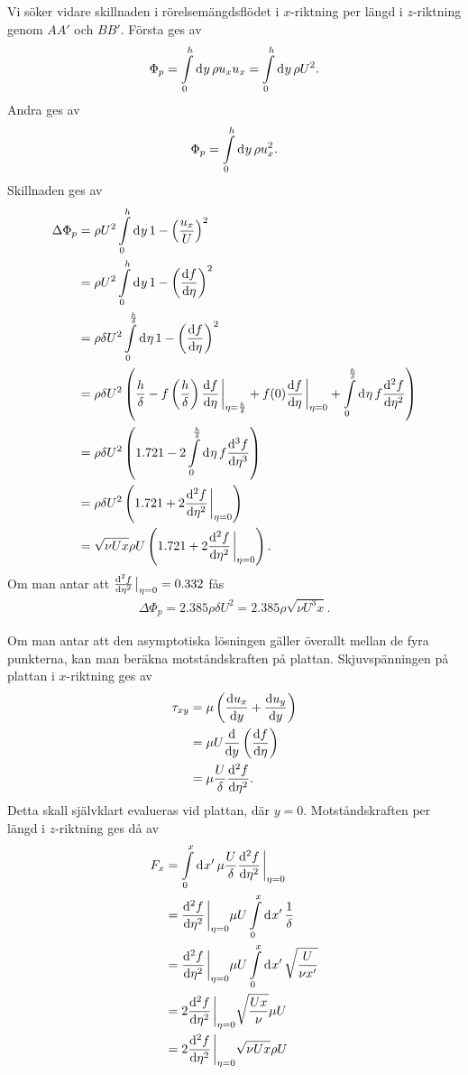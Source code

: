 Vi söker vidare skillnaden i rörelsemängdsflödet i $x$-riktning per längd i $z$-riktning genom $AA'$ och $BB'$. Första ges av
\begin{align*}
	\Phi_{p} = \int\limits_{0}^{h}\dd[]{y}\rho u_{x}u_{x} = \int\limits_{0}^{h}\dd[]{y}\rho U^{2}.
\end{align*}
Andra ges av
\begin{align*}
	\Phi_{p} = \int\limits_{0}^{h}\dd[]{y}\rho u_{x}^{2}.
\end{align*}
Skillnaden ges av
\begin{align*}
	\Delta\Phi_{p} &= \rho U^{2}\integ{0}{h}{y}{1 - \left(\frac{u_{x}}{U}\right)^{2}} \\
	               &= \rho U^{2}\integ{0}{h}{y}{1 - \left(\dv{f}{\eta}\right)^{2}} \\
	               &= \rho\delta U^{2}\integ{0}{\frac{h}{\delta}}{\eta}{1 - \left(\dv{f}{\eta}\right)^{2}} \\
	               &= \rho\delta U^{2}\left(\frac{h}{\delta} - f\left(\frac{h}{\delta}\right)\dv{f}{\eta}\eval_{\eta = \frac{h}{\delta}} + f(0)\dv{f}{\eta}\eval_{\eta = 0} +  \integ{0}{\frac{h}{\delta}}{\eta}{f\dv[2]{f}{\eta}}\right) \\
	               &= \rho\delta U^{2}\left(1.721 - 2\integ{0}{\frac{h}{\delta}}{\eta}{f\dv[3]{f}{\eta}}\right) \\
	               &= \rho\delta U^{2}\left(1.721 + 2\dv[2]{f}{\eta}\eval_{\eta = 0}\right) \\
	               &= \sqrt{\nu Ux}\rho U\left(1.721 + 2\dv[2]{f}{\eta}\eval_{\eta = 0}\right).
\end{align*}
Om man antar att $\dv[2]{f}{\eta}\eval_{\eta = 0} = 0.332$ fås
\begin{align*}
	\Delta\Phi_{p} = 2.385\rho\delta U^{2} = 2.385\rho\sqrt{\nu U^{3}x}.
\end{align*}

Om man antar att den asymptotiska lösningen gäller överallt mellan de fyra punkterna, kan man beräkna motståndskraften på plattan. Skjuvspänningen på plattan i $x$-riktning ges av
\begin{align*}
	\tau_{xy} &= \mu\left(\dv{u_{x}}{y} + \dv{u_{y}}{y}\right) \\
	          &= \mu U\dv{y}\left(\dv{f}{\eta}\right) \\
	          &= \mu\frac{U}{\delta}\dv[2]{f}{\eta}.
\end{align*}
Detta skall självklart evalueras vid plattan, där $y = 0$. Motståndskraften per längd i $z$-riktning ges då av
\begin{align*}
	F_{x} &= \integ{0}{x}{x'}{\mu\frac{U}{\delta}\dv[2]{f}{\eta}\eval_{\eta = 0}} \\
	      &= \dv[2]{f}{\eta}\eval_{\eta = 0}\mu U\integ{0}{x}{x'}{\frac{1}{\delta}} \\
	      &= \dv[2]{f}{\eta}\eval_{\eta = 0}\mu U\integ{0}{x}{x'}{\sqrt{\frac{U}{\nu x'}}} \\
	      &= 2\dv[2]{f}{\eta}\eval_{\eta = 0}\sqrt{\frac{Ux}{\nu}}\mu U \\
	      &= 2\dv[2]{f}{\eta}\eval_{\eta = 0}\sqrt{\nu Ux}\rho U
\end{align*}

